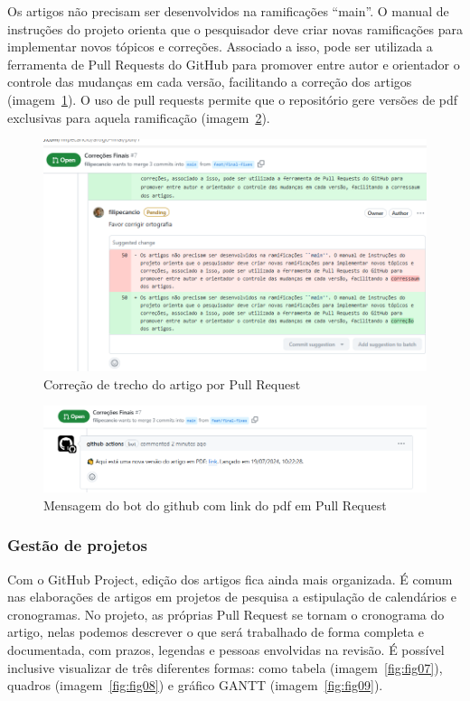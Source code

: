 Os artigos não precisam ser desenvolvidos na ramificações ``main''. O manual de instruções do projeto orienta que o pesquisador deve criar novas ramificações para implementar novos tópicos e correções. Associado a isso, pode ser utilizada a ferramenta de Pull Requests do GitHub para promover entre autor e orientador o controle das mudanças em cada versão, facilitando a correção dos artigos (imagem~\ref{fig:fig05}). O uso de pull requests permite que o repositório gere versões de pdf exclusivas para aquela ramificação (imagem~\ref{fig:fig06}).

\begin{figure}[ht]
	\centering
	\includegraphics[width=.6\textwidth]{./images/fig05.png}
	\caption{Correção de trecho do artigo por Pull Request}
	\label{fig:fig05}
\end{figure}

\begin{figure}[ht]
	\centering
	\includegraphics[width=.6\textwidth]{./images/fig06.png}
	\caption{Mensagem do bot do github com link do pdf em Pull Request}
	\label{fig:fig06}
\end{figure}


\subsubsection{Gestão de projetos}
Com o GitHub Project,  edição dos artigos fica ainda mais organizada. É comum nas elaborações de artigos em projetos de pesquisa a estipulação de calendários e cronogramas. No projeto, as próprias Pull Request se tornam o cronograma do artigo, nelas podemos descrever o que será trabalhado de forma completa e documentada, com prazos, legendas e pessoas envolvidas na revisão. É possível inclusive visualizar de três diferentes formas: como tabela (imagem~\ref{fig:fig07}), quadros (imagem~\ref{fig:fig08}) e gráfico GANTT (imagem~\ref{fig:fig09}).

